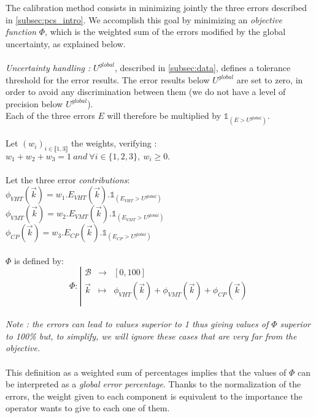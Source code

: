 The calibration method consists in minimizing jointly the three errors described in \ref{subsec:pcs_intro}. We accomplish this goal by minimizing an \emph{objective function} $\Phi$, which is the weighted sum of the errors modified by the global uncertainty, as explained below.\\
\\
\emph{Uncertainty handling :} $U^{global}$, described in \ref{subsec:data}, defines a tolerance threshold for the error results. The error results below $U^{global}$ are set to zero, in order to avoid any discrimination between them (we do not have a level of precision below $U^{global}$).\\
Each of the three errors $E$ will therefore be multiplied by $\mathds{1}_{(E>U^{global})}.$\\ 
\\
Let $(w_{i})_{i\in\llbracket 1,3 \rrbracket}$ the weights, verifying :\\
$w_{1}+w_{2}+w_{3}=1\ and\ \forall i\in \{1,2,3\},\ w_{i}\geq 0.$\\
\\
Let the three error \emph{contributions}:\\
$\phi_{VHT}(\vec{k})=w_{1}.E_{VHT}(\vec{k}).\mathds{1}_{(E_{VHT}>U^{global})}$\\
$\phi_{VMT}(\vec{k})=w_{2}.E_{VMT}(\vec{k}).\mathds{1}_{(E_{VMT}>U^{global})}$\\
$\phi_{CP}(\vec{k})=w_{3}.E_{CP}(\vec{k}).\mathds{1}_{(E_{CP}>U^{global})}$\\
\\
$\Phi$ is defined by:\\
\begin{displaymath}
		\Phi:
		\left|
  		\begin{array}{rcl}
    	\mathscr{B} & \longrightarrow &[0,100] \\
    	\vec{k} & \longmapsto &  \phi_{VHT}(\vec{k})+\phi_{VMT}(\vec{k})+\phi_{CP}(\vec{k}) \\
  	\end{array}
	\right.
\end{displaymath}
\\
\emph{Note : the errors can lead to values superior to 1 thus giving values of $\Phi$ superior to 100\% but, to simplify, we will ignore these cases that are very far from the objective.}\\
\\

This definition as a weighted sum of percentages implies that the values of $\Phi$ can be interpreted as a \emph{global error percentage}. Thanks to the normalization of the errors, the weight given to each component is equivalent to the importance the operator wants to give to each one of them.
